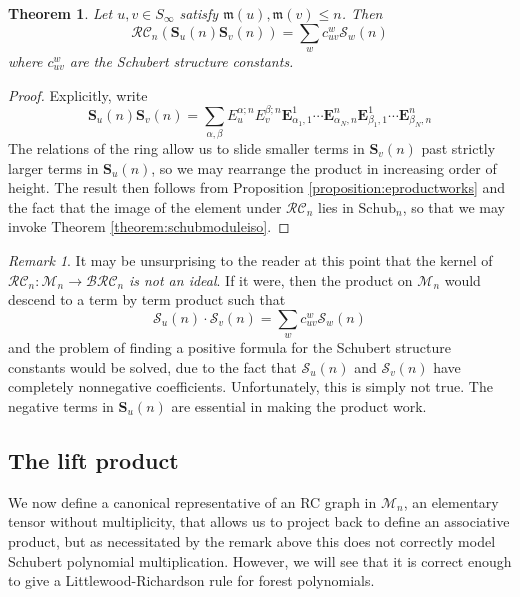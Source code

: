 \documentclass{amsart}
\newtheorem{theorem}{Theorem}[section]
\theoremstyle{definition}
\theoremstyle{remark}
\newtheorem*{remark}{Remark}
\numberwithin{equation}{subsection}
\newcommand{\BRC}{\mathcal{BRC}}
\newcommand{\RC}{\mathcal{RC}}
\newcommand{\maxd}{\mathfrak{m}}
\begin{document}
\begin{theorem} \label{theorem:schubproduct}
Let $u,v\in S_\infty$ satisfy $\maxd(u),\maxd(v)\leq n$. Then
$$\RC_n(\mathbf{S}_u(n)\mathbf{S}_v(n)) = \sum_{w} c_{uv}^w \mathcal{S}_w(n)$$
where $c_{uv}^w$ are the Schubert structure constants.
\end{theorem}
\begin{proof}
  Explicitly, write
  $$\mathbf{S}_u(n)\mathbf{S}_v(n) = \sum_{\alpha,\beta} E_u^{\alpha;n}E_v^{\beta;n} \mathbf{E}_{\alpha_1,1}^1 \cdots  \mathbf{E}_{\alpha_N,n}^n \mathbf{E}_{\beta_1,1}^1 \cdots  \mathbf{E}_{\beta_N,n}^n$$
  The relations of the ring allow us to slide smaller terms in $\mathbf{S}_v(n)$ past strictly larger terms in $\mathbf{S}_u(n)$, so we may rearrange the product in increasing order of height. The result then follows from Proposition \ref{proposition:eproductworks} and the fact that the image of the element under $\RC_n$ lies in $\mathrm{Schub}_n$, so that we may invoke Theorem \ref{theorem:schubmoduleiso}.
\end{proof}

\begin{remark}
It may be unsurprising to the reader at this point that the kernel of $\RC_n:\mathcal{M}_n\to \BRC_n$ \emph{is not an ideal}. If it were, then the product on $\mathcal{M}_n$ would descend to a term by term product such that
$$\mathcal{S}_u(n)\cdot \mathcal{S}_v(n) = \sum_{w} c_{uv}^w \mathcal{S}_w(n)$$
and the problem of finding a positive formula for the Schubert structure constants would be solved, due to the fact that $\mathcal{S}_u(n)$ and $\mathcal{S}_v(n)$ have completely nonnegative coefficients. Unfortunately, this is simply not true. The negative terms in $\mathbf{S}_u(n)$ are essential in making the product work.
\end{remark}


\subsection{The lift product}\label{section:liftproduct}

We now define a canonical representative of an RC graph in $\mathcal{M}_n$, an elementary tensor without multiplicity, that allows us to project back to define an associative product, but as necessitated by the remark above this does not correctly model Schubert polynomial multiplication. However, we will see that it is correct enough to give a Littlewood-Richardson rule for forest polynomials.
\end{document}

